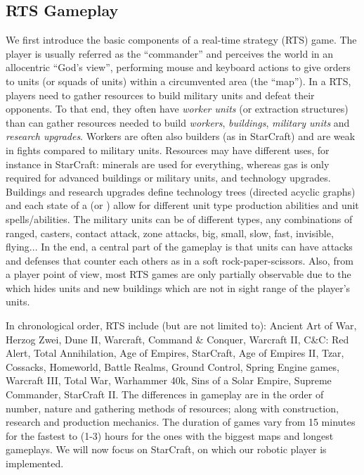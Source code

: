 \subsection{RTS Gameplay}
We first introduce the basic components of a real-time strategy (RTS) game. The player is usually referred as the ``commander'' and perceives the world in an allocentric ``God's view'', performing mouse and keyboard actions to give orders to units (or squads of units) within a circumvented area (the ``map''). In a RTS, players need to gather resources to build military units and defeat their opponents. To that end, they often have \textit{worker units} (or extraction structures) than can gather resources needed to build \textit{workers}, \textit{buildings}, \textit{military units} and \textit{research upgrades}. Workers are often also builders (as in StarCraft) and are weak in fights compared to military units. Resources may have different uses, for instance in StarCraft: minerals are used for everything, whereas gas is only required for advanced buildings or military units, and technology upgrades. Buildings and research upgrades define technology trees (directed acyclic graphs) and each state of a 
 (or ) allow for different unit type production abilities and unit spells/abilities. The military units can be of different types, any combinations of ranged, casters, contact attack, zone attacks, big, small, slow, fast, invisible, flying... In the end, a central part of the gameplay is that units can have attacks and defenses that counter each others as in a soft rock-paper-scissors. Also, from a player point of view, most RTS games are only partially observable due to the \textit{} which hides units and new buildings which are not in sight range of the player's units. 


In chronological order, RTS include (but are not limited to): Ancient Art of War, Herzog Zwei, Dune II, Warcraft, Command \& Conquer, Warcraft II, C\&C: Red Alert, Total Annihilation, Age of Empires, StarCraft, Age of Empires II, Tzar, Cossacks, Homeworld, Battle Realms, Ground Control, Spring Engine games, Warcraft III, Total War, Warhammer 40k, Sins of a Solar Empire, Supreme Commander, StarCraft II. The differences in gameplay are in the order of number, nature and gathering methods of resources; along with construction, research and production mechanics. The duration of games vary from 15 minutes for the fastest to (1-3) hours for the ones with the biggest maps and longest gameplays. We will now focus on StarCraft, on which our robotic player is implemented.


